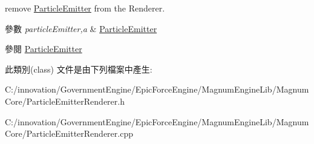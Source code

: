 remove \hyperlink{class_i_dream_sky_1_1_particle_emitter}{Particle\+Emitter} from the Renderer. 


\begin{DoxyParams}{參數}
{\em particle\+Emitter,a} & \hyperlink{class_i_dream_sky_1_1_particle_emitter}{Particle\+Emitter} \\
\hline
\end{DoxyParams}
\begin{DoxySeeAlso}{參閱}
\hyperlink{class_i_dream_sky_1_1_particle_emitter}{Particle\+Emitter} 
\end{DoxySeeAlso}


此類別(class) 文件是由下列檔案中產生\+:\begin{DoxyCompactItemize}
\item 
C\+:/innovation/\+Government\+Engine/\+Epic\+Force\+Engine/\+Magnum\+Engine\+Lib/\+Magnum\+Core/Particle\+Emitter\+Renderer.\+h\item 
C\+:/innovation/\+Government\+Engine/\+Epic\+Force\+Engine/\+Magnum\+Engine\+Lib/\+Magnum\+Core/Particle\+Emitter\+Renderer.\+cpp\end{DoxyCompactItemize}
